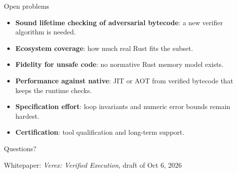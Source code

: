 \documentclass[aspectratio=169,11pt]{beamer}
\begin{document}
\begin{frame}{Open problems}
  \begin{itemize}\setlength{\itemsep}{6pt}
    \item \textbf{Sound lifetime checking of adversarial bytecode}: a new verifier algorithm is needed.
    \item \textbf{Ecosystem coverage}: how much real Rust fits the subset.
    \item \textbf{Fidelity for unsafe code}: no normative Rust memory model exists.
    \item \textbf{Performance against native}: JIT or AOT from verified bytecode that keeps the runtime checks.
    \item \textbf{Specification effort}: loop invariants and numeric error bounds remain hardest.
    \item \textbf{Certification}: tool qualification and long-term support.
  \end{itemize}
\end{frame}

\begin{frame}[standout]
  Questions?
  \vspace{0.8em}

  \small
  Whitepaper: \emph{Verex: Verified Execution}, draft of Oct 6, 2026
\end{frame}
\end{document}
